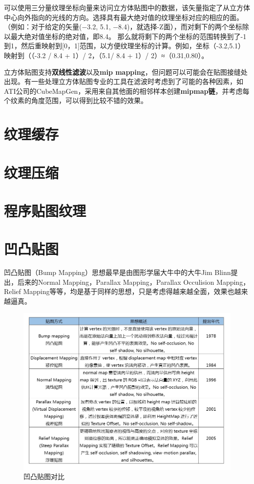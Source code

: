 \documentclass[UTF8,a4paper,12pt]{ctexbook}
\begin{document}
		可以使用三分量纹理坐标向量来访问立方体贴图中的数据，该矢量指定了从立方体中心向外指向的光线的方向。选择具有最大绝对值的纹理坐标对应的相应的面。（例如：对于给定的矢量(−3.2, 5.1, −8.4)，就选择-Z面），而对剩下的两个坐标除以最大绝对值坐标的绝对值，即8.4。 那么就将剩下的两个坐标的范围转换到了-1到1，然后重映射到[0，1]范围，以方便纹理坐标的计算。例如，坐标（-3.2,5.1）映射到（（-3.2 / 8.4 + 1）/ 2，（5.1/ 8.4 + 1）/ 2）≈（0.31,0.80）。
		
		立方体贴图支持\textbf{双线性滤波}以及\textbf{mip mapping}，但问题可以可能会在贴图接缝处出现。有一些处理立方体贴图专业的工具在滤波时考虑到了可能的各种因素，如ATI公司的CubeMapGen，采用来自其他面的相邻样本创建\textbf{mipmap链}，并考虑每个纹素的角度范围，可以得到比较不错的效果。
				
	\section{纹理缓存}
	
	\section{纹理压缩}
	
	\section{程序贴图纹理}
	
	\section{凹凸贴图}
		凹凸贴图（Bump Mapping）思想最早是由图形学届大牛中的大牛Jim Blinn提出，后来的Normal Mapping，Parallax Mapping，Parallax Occulision Mapping，Relief Mapping等等，均是基于同样的思想，只是考虑得越来越全面，效果也越来越逼真。
		
		\begin{figure}[H]
			\centering
			\includegraphics[scale=0.53]{normMap}
			\caption{凹凸贴图对比}
		\end{figure}
		
\end{document}
